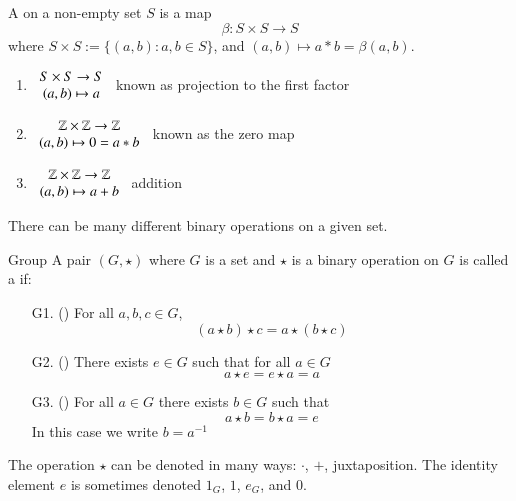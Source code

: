 \documentclass[12pt, a4paper, twoside, openright, titlepage]{book}
\begin{document}
\begin{defn}{}{}
    A  on a non-empty set $S$ is a map $$\beta:S\times S\rightarrow S$$ where $S\times S := \{(a,b): a,b \in S\}$, and $(a,b)\mapsto a*b = \beta(a,b)$.
\end{defn}

\begin{eg}{}{}
    \leavevmode
    \begin{enumerate}
        \item $\begin{array}{c} S\times S\rightarrow S \\ (a,b)\mapsto a \end{array}$ known as projection to the first factor
        \item $\begin{array}{c} \mathbb Z\times \mathbb Z\rightarrow \mathbb Z \\ (a,b)\mapsto 0 = a*b \end{array}$ known as the zero map
        \item $\begin{array}{c} \mathbb Z\times \mathbb Z\rightarrow \mathbb Z \\ (a,b)\mapsto a+b \end{array}$ addition
    \end{enumerate}
    \begin{rmk}{}{}
        There can be many different binary operations on a given set.
    \end{rmk}
\end{eg}

\begin{defn}{Group}{}
    A pair $(G, \star)$ where $G$ is a set and $\star$ is a binary operation on $G$ is called a  if: \begin{enumerate}
        \item[G1.] () For all $a,b,c \in G$, $$(a\star b)\star c = a\star (b\star c)$$
        \item[G2.] () There exists $e \in G$ such that for all $a \in G$ $$a\star e = e \star a = a$$
        \item[G3.] () For all $a \in G$ there exists $b \in G$ such that $$a \star b = b \star a = e$$ In this case we write $b = a^{-1}$
    \end{enumerate}
\end{defn}


\begin{rmk}{}{}
    The operation $\star$ can be denoted in many ways: $\cdot$, $+$, juxtaposition. The identity element $e$ is sometimes denoted $1_G$, $1$, $e_G$, and $0$.
\end{rmk}
\end{document}
